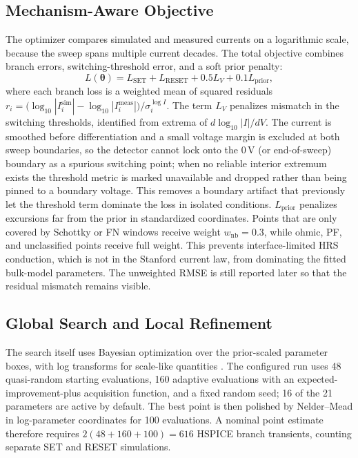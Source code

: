 \documentclass[journal]{IEEEtran}
\begin{document}
\subsection{Mechanism-Aware Objective}
\label{sec:loss}

The optimizer compares simulated and measured currents on a logarithmic
scale, because the sweep spans multiple current decades.  The total objective
combines branch errors, switching-threshold error, and a soft prior penalty:
\begin{equation}
  L(\boldsymbol{\theta})
  =
  L_{\mathrm{SET}}+L_{\mathrm{RESET}}
  +0.5L_V+0.1L_{\mathrm{prior}},
  \label{eq:loss}
\end{equation}
where each branch loss is a weighted mean of squared residuals
$r_i=\bigl(\log_{10}|I_i^{\mathrm{sim}}|-\log_{10}|I_i^{\mathrm{meas}}|
\bigr)/\sigma_i^{\log I}$.  The term $L_V$ penalizes mismatch in the
switching thresholds, identified from extrema of $d\log_{10}|I|/dV$.  The
current is smoothed before differentiation and a small voltage margin is
excluded at both sweep boundaries, so the detector cannot lock onto the
$0\,\mathrm{V}$ (or end-of-sweep) boundary as a spurious switching point; when
no reliable interior extremum exists the threshold metric is marked
unavailable and dropped rather than being pinned to a boundary voltage.  This
removes a boundary artifact that previously let the threshold term dominate the
loss in isolated conditions.  $L_{\mathrm{prior}}$ penalizes excursions far
from the prior in standardized coordinates.  Points that are only covered by Schottky or FN windows receive
weight $w_{\mathrm{nb}}=0.3$, while ohmic, PF, and unclassified points receive
full weight.  This prevents interface-limited HRS conduction, which is not in
the Stanford current law, from dominating the fitted bulk-model parameters.
The unweighted RMSE is still reported later so that the residual mismatch
remains visible.

\subsection{Global Search and Local Refinement}
\label{sec:opt}

The search itself uses Bayesian optimization over the prior-scaled parameter
boxes, with log transforms for scale-like quantities
\cite{snoek2012practical,shahriari2016}.  The configured run uses 48
quasi-random starting evaluations, 160 adaptive evaluations with an
expected-improvement-plus acquisition function, and a fixed random seed; 16 of
the 21 parameters are active by default.  The best point is then polished by
Nelder--Mead in log-parameter coordinates for 100 evaluations.  A nominal
point estimate therefore requires $2(48+160+100)=616$ HSPICE branch
transients, counting separate SET and RESET simulations.
\end{document}
